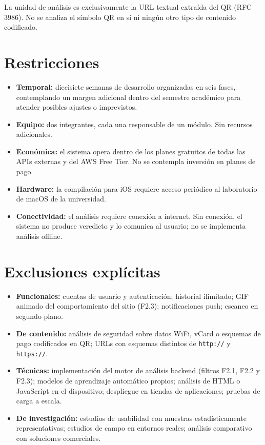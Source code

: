 La unidad de análisis es exclusivamente la URL textual extraída del QR (RFC 3986). No se analiza el símbolo QR en sí ni ningún otro tipo de contenido codificado.

\section{Restricciones}

\begin{itemize}
    \item \textbf{Temporal:} diecisiete semanas de desarrollo organizadas en seis fases, contemplando un margen adicional dentro del semestre académico para atender posibles ajustes o imprevistos.
    \item \textbf{Equipo:} dos integrantes, cada una responsable de un módulo. Sin recursos adicionales.
    \item \textbf{Económica:} el sistema opera dentro de los planes gratuitos de todas las APIs externas y del AWS Free Tier. No se contempla inversión en planes de pago.
    \item \textbf{Hardware:} la compilación para iOS requiere acceso periódico al laboratorio de macOS de la universidad.
    \item \textbf{Conectividad:} el análisis requiere conexión a internet. Sin conexión, el sistema no produce veredicto y lo comunica al usuario; no se implementa análisis offline.
\end{itemize}

\section{Exclusiones explícitas}

\begin{itemize}
    \item \textbf{Funcionales:} cuentas de usuario y autenticación; historial ilimitado; GIF animado del comportamiento del sitio (F2.3); notificaciones push; escaneo en segundo plano.
    \item \textbf{De contenido:} análisis de seguridad sobre datos WiFi, vCard o esquemas de pago codificados en QR; URLs con esquemas distintos de \texttt{http://} y \texttt{https://}.
    \item \textbf{Técnicas:} implementación del motor de análisis backend (filtros F2.1, F2.2 y F2.3); modelos de aprendizaje automático propios; análisis de HTML o JavaScript en el dispositivo; despliegue en tiendas de aplicaciones; pruebas de carga a escala.
    \item \textbf{De investigación:} estudios de usabilidad con muestras estadísticamente representativas; estudios de campo en entornos reales; análisis comparativo con soluciones comerciales.
\end{itemize}